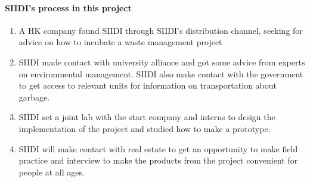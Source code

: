 \documentclass[12pt]{article}
\begin{document}
\paragraph{SIIDI's process in this project}
\begin{enumerate}
\item A HK company found SIIDI through SIIDI's distribution channel, seeking for advice on how to incubate a waste management project
\item SIIDI made contact with university alliance and got some advice from experts on environmental management. SIIDI also make contact with the government to get access to relevant units for information on transportation about garbage.
\item SIIDI set a joint lab with the start company and interns to design the implementation of the project and studied how to make a prototype.
\item SIIDI will make contact with real estate to get an opportunity to make field practice and interview to make the products from the project convenient for people at all ages.
\end{enumerate}
\end{document}
